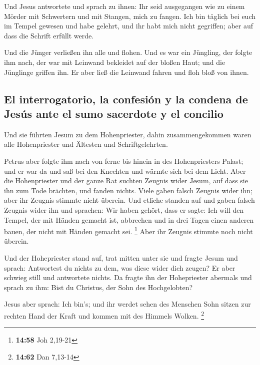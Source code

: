  Und Jesus antwortete und sprach zu ihnen: Ihr seid
ausgegangen wie zu einem Mörder mit Schwertern und mit Stangen, mich zu
fangen.  Ich bin täglich bei euch im Tempel gewesen und
habe gelehrt, und ihr habt mich nicht gegriffen; aber auf dass die
Schrift erfüllt werde.

 Und die Jünger verließen ihn alle und flohen.
 Und es war ein Jüngling, der folgte ihm nach, der war
mit Leinwand bekleidet auf der bloßen Haut; und die Jünglinge griffen
ihn.  Er aber ließ die Leinwand fahren und floh bloß von
ihnen.

\hypertarget{el-interrogatorio-la-confesiuxf3n-y-la-condena-de-jesuxfas-ante-el-sumo-sacerdote-y-el-concilio}{%
\subsection{El interrogatorio, la confesión y la condena de Jesús ante
el sumo sacerdote y el
concilio}\label{el-interrogatorio-la-confesiuxf3n-y-la-condena-de-jesuxfas-ante-el-sumo-sacerdote-y-el-concilio}}

 Und sie führten Jesum zu dem Hohenpriester, dahin
zusammengekommen waren alle Hohenpriester und Ältesten und
Schriftgelehrten.

 Petrus aber folgte ihm nach von ferne bis hinein in des
Hohenpriesters Palast; und er war da und saß bei den Knechten und wärmte
sich bei dem Licht.  Aber die Hohenpriester und der ganze
Rat suchten Zeugnis wider Jesum, auf dass sie ihn zum Tode brächten, und
fanden nichts.  Viele gaben falsch Zeugnis wider ihn;
aber ihr Zeugnis stimmte nicht überein.  Und etliche
standen auf und gaben falsch Zeugnis wider ihn und sprachen:
 Wir haben gehört, dass er sagte: Ich will den Tempel,
der mit Händen gemacht ist, abbrechen und in drei Tagen einen anderen
bauen, der nicht mit Händen gemacht sei. \footnote{\textbf{14:58} Joh
  2,19-21}  Aber ihr Zeugnis stimmte noch nicht überein.

 Und der Hohepriester stand auf, trat mitten unter sie
und fragte Jesum und sprach: Antwortest du nichts zu dem, was diese
wider dich zeugen?  Er aber schwieg still und antwortete
nichts. Da fragte ihn der Hohepriester abermals und sprach zu ihm: Bist
du Christus, der Sohn des Hochgelobten?

 Jesus aber sprach: Ich bin's; und ihr werdet sehen des
Menschen Sohn sitzen zur rechten Hand der Kraft und kommen mit des
Himmels Wolken. \footnote{\textbf{14:62} Dan 7,13-14}

